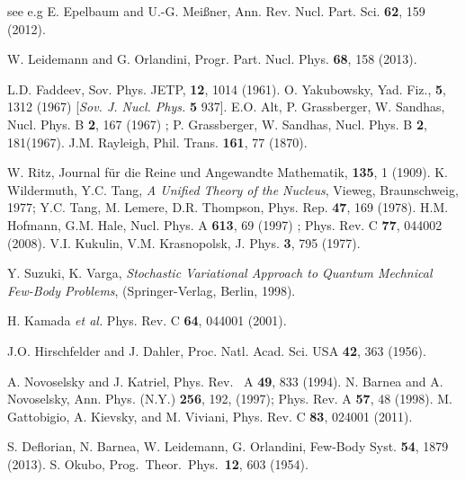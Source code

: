 \begin{thebibliography}{00}
 see e.g E. Epelbaum and U.-G. Mei{\ss}ner, Ann. Rev. Nucl. Part. Sci. {\bf 62}, 159 (2012).

 W. Leidemann and G. Orlandini,  Progr. Part.  Nucl. Phys. {\bf 68}, 158  (2013).

 L.D. Faddeev, Sov. Phys. JETP, {\bf 12}, 1014 (1961).
 O. Yakubowsky,   
        Yad. Fiz., {\bf 5}, 1312 (1967) [{\it Sov. J. Nucl. Phys.} {\bf 5} 937]. 
  E.O. Alt, P. Grassberger, W. Sandhas, Nucl. Phys. B {\bf 2},  167 (1967) ;
               P. Grassberger, W. Sandhas, Nucl. Phys. B {\bf 2}, 181(1967). 
 J.M. Rayleigh, Phil. Trans. {\bf 161}, 77 (1870).

 W. Ritz, 
   Journal f\"ur die Reine und Angewandte Mathematik, {\bf 135}, 1 (1909).
 K. Wildermuth, Y.C. Tang, \textit{A Unified Theory of the Nucleus}, Vieweg, Braunschweig, 1977;
                Y.C. Tang, M. Lemere, D.R. Thompson, Phys. Rep. {\bf 47}, 169 (1978). 
 H.M. Hofmann, G.M. Hale, Nucl. Phys. A {\bf 613}, 69 (1997) ;
             Phys. Rev. C {\bf 77}, 044002 (2008). 
 V.I. Kukulin, V.M. Krasnopolsk, J. Phys. {\bf 3},  795 (1977).

  Y. Suzuki, K. Varga, \textit{Stochastic Variational Approach to Quantum Mechnical Few-Body Problems},
                  (Springer-Verlag, Berlin, 1998).
                  
  H. Kamada {\it et al.} Phys. Rev. C {\bf 64}, 044001 (2001).       

 J.O. Hirschfelder and J. Dahler, Proc. Natl. Acad. Sci. USA {\bf 42}, 363 (1956).                                 

 A. Novoselsky and J.  Katriel, Phys. Rev.~ A {\bf 49},  833  (1994).
  N. Barnea  and A. Novoselsky,
	 Ann. Phys. (N.Y.)  {\bf 256}, 192, (1997); Phys. Rev.  A {\bf 57},  48 (1998).
  M. Gattobigio, A. Kievsky, and M. Viviani, Phys. Rev. C {\bf 83}, 024001 (2011).

	 S. Deflorian, N. Barnea, W. Leidemann, G. Orlandini, Few-Body Syst. {\bf 54}, 1879 (2013). 
 S. Okubo, Prog.~Theor.~Phys.~{\bf 12}, 603 (1954).


\end{thebibliography}
